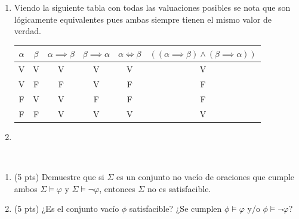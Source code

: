 \begin{sol}
    \begin{enumerate}[label=(\alph*)]
        \item Viendo la siguiente tabla con todas las valuaciones posibles se nota que son lógicamente equivalentes pues ambas siempre tienen el mismo valor de verdad.\\
              \begin{tabular}{|c|c|c|c|c|c|}
                  \hline
                  $\alpha$ & $\beta$ & $\alpha\implies\beta$ & $\beta\implies\alpha$ & $\alpha\iff\beta$ & $((\alpha \implies \beta) \wedge (\beta \implies \alpha))$ \\
                  \hline
                  \hline
                  V        & V       & V                     & V                     & V                 & V                                                          \\
                  V        & F       & F                     & V                     & F                 & F                                                          \\
                  F        & V       & V                     & F                     & F                 & F                                                          \\
                  F        & F       & V                     & V                     & V                 & V                                                          \\
                  \hline
              \end{tabular}
        \item 
    \end{enumerate}
\end{sol}

\begin{prob}[10 pts]
    \
    \begin{enumerate}[label=(\alph*)]
        \item (5 pts) Demuestre que si $\Sigma$ es un conjunto no vacío de oraciones que cumple ambos $\Sigma \models \varphi$ y $\Sigma \models \neg \varphi$, entonces $\Sigma$ no es satisfacible.
        \item (5 pts) ¿Es el conjunto vacío $\phi$ satisfacible? ¿Se cumplen $\phi \models \varphi$ y/o $\phi \models \neg \varphi$?
    \end{enumerate}
\end{prob}

